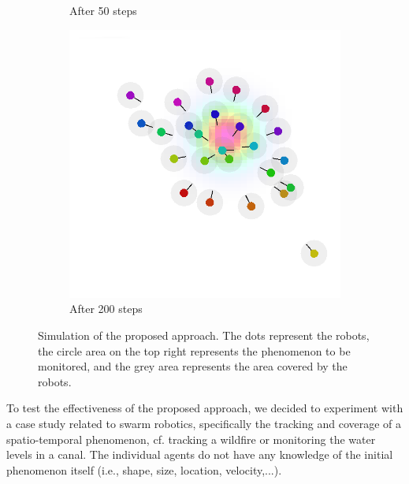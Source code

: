 \documentclass[conference]{IEEEtran}
\begin{document}
\begin{figure}[t]
\begin{subfigure}[b]{0.32\linewidth}
      \caption{After 50 steps}
      \label{fig:after}
  \end{subfigure}
  \begin{subfigure}[b]{0.32\linewidth}
      \includegraphics[width=\textwidth]{imgs/end.png}
      \caption{After 200 steps}
      \label{fig:end}
  \end{subfigure}
  \caption{Simulation of the proposed approach. 
  The dots represent the robots, 
  the circle area on the top right represents the phenomenon to be monitored, 
  and the grey area represents the area covered by the robots.}
  \label{fig:simulations}
\end{figure}
To test the effectiveness of the proposed approach, 
 we decided to experiment with a case study related to swarm robotics, 
 specifically the tracking and coverage of a spatio-temporal phenomenon, cf. tracking a wildfire 
 or monitoring the water levels in a canal. The individual agents do not have any knowledge of the initial phenomenon itself (i.e., shape, size, location, velocity,...).
\end{document}
